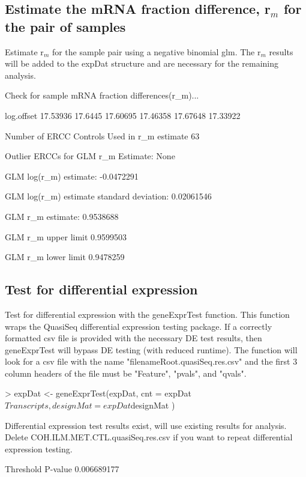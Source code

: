 \documentclass{article}
\begin{document}
\subsection{Estimate the mRNA fraction difference, r$_m$ for the pair of 
samples}
Estimate r$_m$ for the sample pair using a negative binomial glm. The r$_m$ 
results will be added to the expDat structure and are necessary for the 
remaining analysis.
\begin{center}
\begin{Schunk}
\begin{Soutput}
Check for sample mRNA fraction differences(r_m)...

log.offset
17.53936 17.6445 17.60695 17.46358 17.67648 17.33922 

Number of ERCC Controls Used in r_m estimate
63 

Outlier ERCCs for GLM r_m Estimate:
None 

GLM log(r_m) estimate:
-0.0472291 

GLM log(r_m) estimate standard deviation:
0.02061546 
 
GLM r_m estimate:
0.9538688 

GLM r_m upper limit
0.9599503 

GLM r_m lower limit
0.9478259 
\end{Soutput}
\end{Schunk}
\end{center}

\subsection{Test for differential expression}
Test for differential expression with the geneExprTest function. This function
wraps the QuasiSeq differential expression testing package. If a correctly
formatted csv file is provided with the necessary DE test results, then 
geneExprTest will bypass DE testing (with reduced runtime). The function will
look for a csv file with the name "filenameRoot.quasiSeq.res.csv" and the first
3 column headers of the file must be "Feature", "pvals", and "qvals".
\begin{center}
\begin{Schunk}
\begin{Sinput}
> expDat <- geneExprTest(expDat, cnt = expDat$Transcripts,
                         designMat = expDat$designMat )
\end{Sinput}
\begin{Soutput}
 Differential expression test results exist, will use   
 existing results for analysis. Delete COH.ILM.MET.CTL.quasiSeq.res.csv if  
 you want to repeat differential expression testing.    

Threshold P-value
0.006689177 
\end{Soutput}
\end{Schunk}
\end{center}
\end{document}
